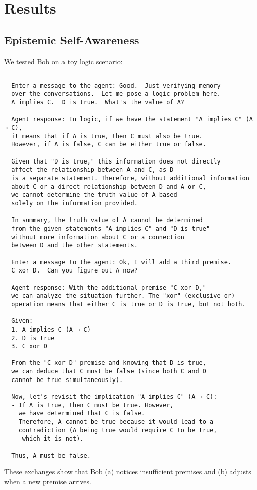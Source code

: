 \documentclass[11pt]{article}
\begin{document}
\section{Results}

\subsection{Epistemic Self-Awareness}
We tested Bob on a toy logic scenario:
\begin{verbatim}

  Enter a message to the agent: Good.  Just verifying memory 
  over the conversations.  Let me pose a logic problem here.  
  A implies C.  D is true.  What's the value of A?
  
  Agent response: In logic, if we have the statement "A implies C" (A → C), 
  it means that if A is true, then C must also be true. 
  However, if A is false, C can be either true or false.
  
  Given that "D is true," this information does not directly 
  affect the relationship between A and C, as D 
  is a separate statement. Therefore, without additional information 
  about C or a direct relationship between D and A or C, 
  we cannot determine the truth value of A based 
  solely on the information provided.
  
  In summary, the truth value of A cannot be determined 
  from the given statements "A implies C" and "D is true" 
  without more information about C or a connection 
  between D and the other statements.

  Enter a message to the agent: Ok, I will add a third premise.  
  C xor D.  Can you figure out A now?

  Agent response: With the additional premise "C xor D," 
  we can analyze the situation further. The "xor" (exclusive or) 
  operation means that either C is true or D is true, but not both.
  
  Given:
  1. A implies C (A → C)
  2. D is true
  3. C xor D
  
  From the "C xor D" premise and knowing that D is true, 
  we can deduce that C must be false (since both C and D 
  cannot be true simultaneously).
  
  Now, let's revisit the implication "A implies C" (A → C):
  - If A is true, then C must be true. However,
    we have determined that C is false.
  - Therefore, A cannot be true because it would lead to a 
    contradiction (A being true would require C to be true,
     which it is not).
  
  Thus, A must be false.

\end{verbatim}
These exchanges show that Bob (a) notices insufficient premises and (b) adjusts when a new premise arrives. 
\end{document}
